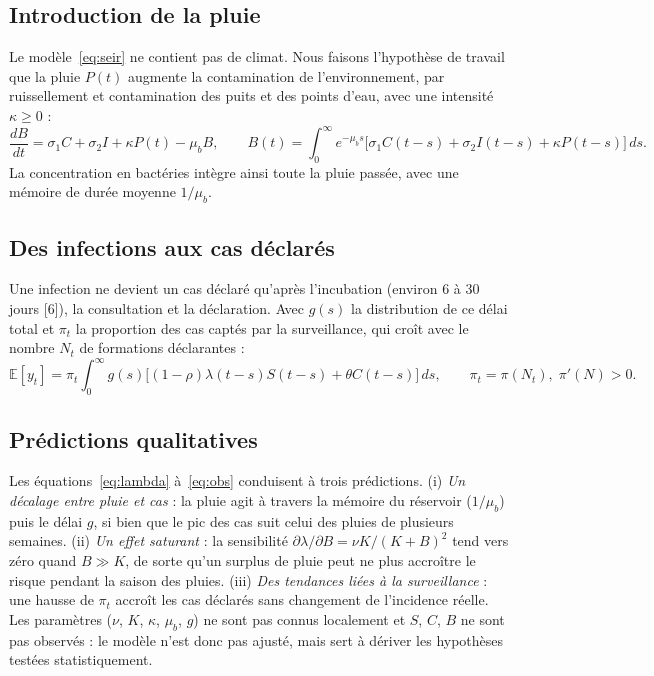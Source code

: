 \documentclass[11pt]{article}
\begin{document}
\subsection{Introduction de la pluie}
Le modèle~\eqref{eq:seir} ne contient pas de climat. Nous faisons l'hypothèse de travail que la pluie $P(t)$ augmente la contamination de l'environnement, par ruissellement et contamination des puits et des points d'eau, avec une intensité $\kappa\ge0$ :
\begin{equation}
\frac{dB}{dt}=\sigma_1 C+\sigma_2 I+\kappa P(t)-\mu_b B,
\qquad
B(t)=\int_0^{\infty}e^{-\mu_b s}\big[\sigma_1C(t-s)+\sigma_2I(t-s)+\kappa P(t-s)\big]\,ds .
\label{eq:pluie}
\end{equation}
La concentration en bactéries intègre ainsi toute la pluie passée, avec une mémoire de durée moyenne $1/\mu_b$.

\subsection{Des infections aux cas déclarés}
Une infection ne devient un cas déclaré qu'après l'incubation (environ 6 à 30 jours [6]), la consultation et la déclaration. Avec $g(s)$ la distribution de ce délai total et $\pi_t$ la proportion des cas captés par la surveillance, qui croît avec le nombre $N_t$ de formations déclarantes :
\begin{equation}
\mathbb{E}[y_t]=\pi_t\int_0^{\infty}g(s)\big[(1-\rho)\lambda(t-s)S(t-s)+\theta C(t-s)\big]\,ds,\qquad \pi_t=\pi(N_t),\;\pi'(N)>0 .
\label{eq:obs}
\end{equation}

\subsection{Prédictions qualitatives}
Les équations~\eqref{eq:lambda} à~\eqref{eq:obs} conduisent à trois prédictions. (i) \textit{Un décalage entre pluie et cas} : la pluie agit à travers la mémoire du réservoir ($1/\mu_b$) puis le délai $g$, si bien que le pic des cas suit celui des pluies de plusieurs semaines. (ii) \textit{Un effet saturant} : la sensibilité $\partial\lambda/\partial B=\nu K/(K+B)^2$ tend vers zéro quand $B\gg K$, de sorte qu'un surplus de pluie peut ne plus accroître le risque pendant la saison des pluies. (iii) \textit{Des tendances liées à la surveillance} : une hausse de $\pi_t$ accroît les cas déclarés sans changement de l'incidence réelle. Les paramètres ($\nu$, $K$, $\kappa$, $\mu_b$, $g$) ne sont pas connus localement et $S$, $C$, $B$ ne sont pas observés : le modèle n'est donc pas ajusté, mais sert à dériver les hypothèses testées statistiquement.
\end{document}
